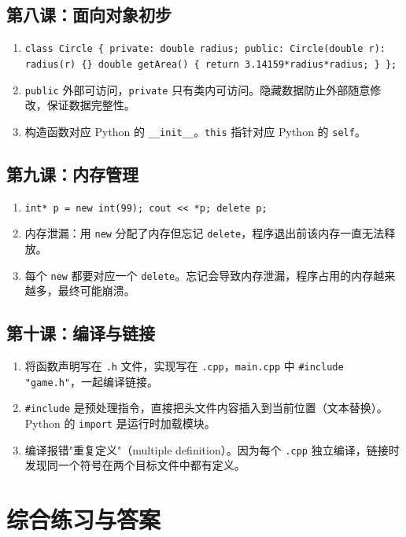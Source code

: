 \documentclass[a4paper,12pt]{ctexart}
\begin{document}
\subsection*{第八课：面向对象初步}
\begin{enumerate}
  \item \texttt{class Circle \{ private: double radius; public: Circle(double r): radius(r) \{\} double getArea() \{ return 3.14159*radius*radius; \} \};}
  \item \texttt{public} 外部可访问，\texttt{private} 只有类内可访问。隐藏数据防止外部随意修改，保证数据完整性。
  \item 构造函数对应 Python 的 \texttt{\_\_init\_\_}。\texttt{this} 指针对应 Python 的 \texttt{self}。
\end{enumerate}

\subsection*{第九课：内存管理}
\begin{enumerate}
  \item \texttt{int* p = new int(99); cout << *p; delete p;}
  \item 内存泄漏：用 \texttt{new} 分配了内存但忘记 \texttt{delete}，程序退出前该内存一直无法释放。
  \item 每个 \texttt{new} 都要对应一个 \texttt{delete}。忘记会导致内存泄漏，程序占用的内存越来越多，最终可能崩溃。
\end{enumerate}

\subsection*{第十课：编译与链接}
\begin{enumerate}
  \item 将函数声明写在 \texttt{.h} 文件，实现写在 \texttt{.cpp}，\texttt{main.cpp} 中 \texttt{\#include "game.h"}，一起编译链接。
  \item \texttt{\#include} 是预处理指令，直接把头文件内容插入到当前位置（文本替换）。Python 的 \texttt{import} 是运行时加载模块。
  \item 编译报错"重复定义"（multiple definition）。因为每个 \texttt{.cpp} 独立编译，链接时发现同一个符号在两个目标文件中都有定义。
\end{enumerate}

\section*{综合练习与答案}
\end{document}
